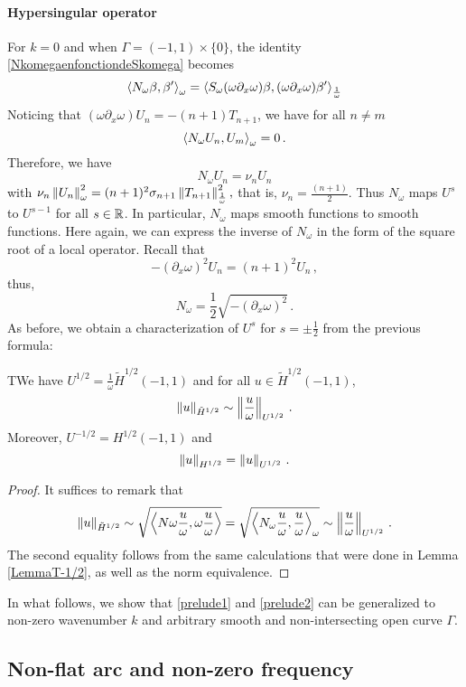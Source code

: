 \documentclass[a4paper]{article}
\begin{document}
\paragraph{Hypersingular operator}For $k = 0$ and when $\Gamma = (-1,1)\times \{0\}$, the identity \eqref{NkomegaenfonctiondeSkomega} becomes
\[\left\langle N_\omega \beta,\beta'\right\rangle_\omega = \left\langle S_\omega (\omega \partial_x \omega) \beta, (\omega \partial_x \omega) \beta'\right\rangle_\frac{1}{\omega}\] 
Noticing that $(\omega \partial_x \omega) U_n = -(n+1) T_{n+1}$, we have for all $n \neq m$ 
\[\left\langle N_\omega U_n,U_m\right\rangle_\omega = 0 \,.\]
Therefore, we have 
\[N_\omega U_n = \nu_n U_n\] 
with 
$\nu_n\left\|U_n\right\|_{\omega}^2 = (n+1)^2 \sigma_{n+1} \left\|T_{n+1}\right\|_\frac{1}{\omega}^2,$
that is, $\nu_n = \frac{(n+1)}{2}$.
Thus $N_\omega$ maps $U^s$ to $U^{s-1}$ for all $s \in \mathbb{R}$. In particular, $N_\omega$ maps smooth functions to smooth functions. 
Here again, we can express the inverse of $N_\omega$ in the form of the square root of a local operator. Recall that
\[-(\partial_x \omega)^2 U_n = (n+1)^2 U_n\,,\]
thus,
\begin{equation}
\label{prelude2}
	N_\omega = \frac{1}{2}\sqrt{-(\partial_x \omega)^2}\,.
\end{equation}
As before, we obtain a characterization of $U^{s}$ for $s = \pm \frac{1}{2}$ from the previous formula:
\begin{Lem} TWe have $U^{1/2} =  \frac{1}{\omega} \tilde{H}^{1/2}(-1,1)$ and for all $u\in \tilde{H}^{1/2}(-1,1)$,
\[\left\|u\right\|_{\tilde{H}^{1/2}} \sim \left\|\frac{u}{\omega}\right\|_{U^{1/2}}\,.\]
Moreover, $U^{-1/2} = H^{1/2}(-1,1)$ and 
\[\left\|u\right\|_{H^{1/2}} = \left\|u\right\|_{U^{1/2}}\,.\]
\end{Lem}
\begin{proof} It suffices to remark that 
	\[ \left\|u\right\|_{\tilde{H}^{1/2}} \sim \sqrt{\left\langle N\omega \frac{u}{\omega},\omega \frac{u}{\omega}\right\rangle} = \sqrt{\left\langle N_\omega \frac{u}{\omega},\frac{u}{\omega}\right\rangle_\omega} \sim \left\|\frac{u}{\omega}\right\|_{U^{1/2}}\,.\]
	The second equality follows from the same calculations that were done in Lemma \ref{LemmaT-1/2}, as well as the norm equivalence. 
\end{proof}


In what follows, we show that \eqref{prelude1} and \eqref{prelude2} can be generalized to non-zero wavenumber $k$ and arbitrary smooth and non-intersecting open curve $\Gamma$. 

\subsection{Non-flat arc and non-zero frequency}
\end{document}
